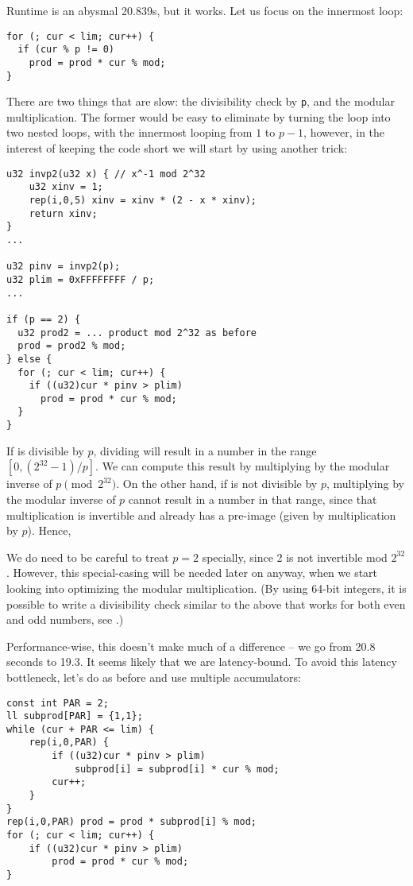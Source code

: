 Runtime is an abysmal 20.839s, but it works.
Let us focus on the innermost loop:
\begin{lstlisting}
for (; cur < lim; cur++) {
  if (cur % p != 0)
    prod = prod * cur % mod;
}
\end{lstlisting}

There are two things that are slow: the divisibility check by \texttt{p}, and the modular multiplication.
The former would be easy to eliminate by turning the loop into two nested loops, with the innermost looping from $1$ to $p-1$, however, in the interest of keeping the code short we will start by using another trick:

\begin{lstlisting}
u32 invp2(u32 x) { // x^-1 mod 2^32
	u32 xinv = 1;
	rep(i,0,5) xinv = xinv * (2 - x * xinv);
	return xinv;
}
...

u32 pinv = invp2(p);
u32 plim = 0xFFFFFFFF / p;
...

if (p == 2) {
  u32 prod2 = ... product mod 2^32 as before
  prod = prod2 % mod;
} else {
  for (; cur < lim; cur++) {
    if ((u32)cur * pinv > plim)
      prod = prod * cur % mod;
  }
}
\end{lstlisting}

If \verb@cur@ is divisible by $p$, dividing will result in a number in the range $[0, (2^{32}-1) / p]$.
We can compute this result by multiplying by the modular inverse of $p \pmod{2^{32}}$.
On the other hand, if \verb@cur@ is not divisible by $p$, multiplying by the modular inverse of $p$ cannot result in a number in that range, since that multiplication is invertible and already has a pre-image (given by multiplication by $p$).
Hence, \verb@cur % p == 0@ can be replaced by \verb@(u32)cur * pinv <= plim@, multiplication being a much cheaper operation than modulo.

We do need to be careful to treat $p = 2$ specially, since 2 is not invertible mod $2^{32}$.
However, this special-casing will be needed later on anyway, when we start looking into optimizing the modular multiplication.
(By using 64-bit integers, it is possible to write a divisibility check similar to the above that works for both even and odd numbers, see \cite{fastdivcheck}.)

Performance-wise, this doesn't make much of a difference -- we go from 20.8 seconds to 19.3.
It seems likely that we are latency-bound.
To avoid this latency bottleneck, let's do as before and use multiple accumulators:

\begin{lstlisting}
const int PAR = 2;
ll subprod[PAR] = {1,1};
while (cur + PAR <= lim) {
	rep(i,0,PAR) {
		if ((u32)cur * pinv > plim)
			subprod[i] = subprod[i] * cur % mod;
		cur++;
	}
}
rep(i,0,PAR) prod = prod * subprod[i] % mod;
for (; cur < lim; cur++) {
	if ((u32)cur * pinv > plim)
		prod = prod * cur % mod;
}
\end{lstlisting}


